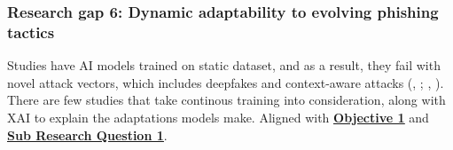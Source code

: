 
\subsubsection*{Research gap 6: Dynamic adaptability to evolving phishing tactics}\label{research-gap-6}
Studies have AI models trained on static dataset, and as a result, they fail with novel attack vectors, which includes deepfakes and context-aware attacks (\citeauthor{kapoor2024comparative}, \citeyear{kapoor2024comparative}; \citeauthor{atlam2022business}, \citeyear{atlam2022business}). There are few studies that take continous training into consideration, along with XAI to explain the adaptations models make. Aligned with \hyperref[objective-1]{\uline{\textbf{Objective 1}}} and \hyperref[sub-research-q1]{\uline{\textbf{Sub Research Question 1}}}.
